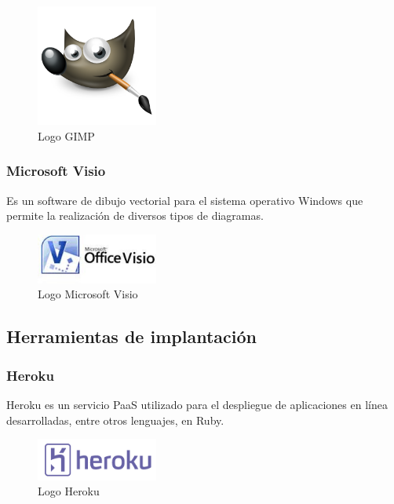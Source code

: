		\begin{figure}[H]
		\centering
		\includegraphics[width=40mm, fbox={\fboxrule} 4mm]{images/04-metodo/35-gimp_logo.png}
		\caption{Logo \ac{GIMP}}
		\label{fig:gimp-logo}
		\end{figure}
		
		\subsubsection{Microsoft Visio}
		Es un software de dibujo vectorial para el sistema operativo Windows que permite la realización de diversos tipos de diagramas. 
		
		\begin{figure}[H]
		\centering
		\includegraphics[width=40mm, fbox={\fboxrule} 4mm]{images/04-metodo/36-visio_logo.jpg}
		\caption{Logo Microsoft Visio}
		\label{fig:visio-logo}
		\end{figure}
	
	\subsection{Herramientas de implantación}
		\subsubsection{Heroku}
		\label{subsubsection:heroku}
		Heroku es un servicio \ac{PaaS} utilizado para el despliegue de aplicaciones en línea desarrolladas, entre otros lenguajes, en Ruby.
				
		\begin{figure}[H]
		\centering
		\includegraphics[width=40mm, fbox={\fboxrule} 4mm]{images/04-metodo/37-heroku_logo.png}
		\caption{Logo Heroku}
		\label{fig:heroku-logo}
		\end{figure}
	

